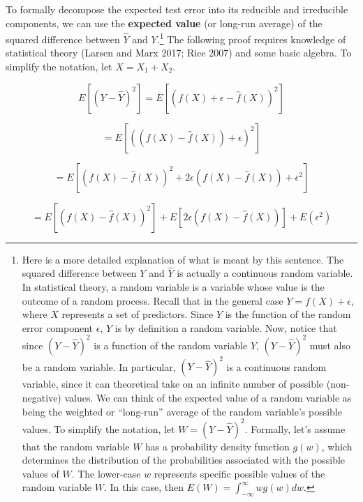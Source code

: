 \documentclass{book}
\begin{document}
To formally decompose the expected test error into its reducible and
irreducible components, we can use the \textbf{expected value} (or long-run
average) of the squared difference between \(\hat{Y}\) and \(Y\).\footnote{Here
  is a more detailed explanation of what is meant by this sentence. The
  squared difference between \(Y\) and \(\hat{Y}\) is actually a continuous
  random variable. In statistical theory, a random variable is a variable
  whose value is the outcome of a random process. Recall that in the general
  case \(Y = f(X) + \epsilon\), where \(X\) represents a set of predictors.
  Since \(Y\) is the function of the random error component \(\epsilon\),
  \(Y\) is by definition a random variable. Now, notice that since
  \((Y-\hat{Y})^{2}\) is a function of the random variable \(Y\),
  \((Y-\hat{Y})^{2}\) must also be a random variable. In particular,
  \((Y-\hat{Y})^{2}\) is a continuous random variable, since it can
  theoretical take on an infinite number of possible (non-negative) values. We
  can think of the expected value of a random variable as being the weighted
  or ``long-run'' average of the random variable's possible values. To
  simplify the notation, let \(W=(Y-\hat{Y})^{2}\). Formally, let's assume
  that the random variable \(W\) has a probability density function \(g(w)\),
  which determines the distribution of the probabilities associated with the
  possible values of \(W\). The lower-case \(w\) represents specific possible
  values of the random variable \(W\). In this case, then
  \(E(W) = \int_{-\infty}^{\infty} wg(w) dw\).} The following proof requires
knowledge of statistical theory (Larsen and Marx 2017; Rice 2007) and some
basic algebra. To simplify the notation, let \(X=X_{1}+X_{2}\).

\[E \left[  \left( Y-\hat{Y} \right) ^{2} \right] =E \left[  \left( f \left( X \right) + \epsilon -\hat{f} \left( X \right)  \right) ^{2} \right]\]

\[=E \left[  \left(  \left( f \left( X \right) -\hat{f} \left( X \right)  \right) + \epsilon  \right) ^{2} \right]\]

\[=E \left[  \left( f \left( X \right) -\hat{f} \left( X \right)  \right) ^{2}+2 \epsilon  \left( f \left( X \right) -\hat{f} \left( X \right)  \right) + \epsilon ^{2} \right]\]

\[=E \left[  \left( f \left( X \right) -\hat{f} \left( X \right)  \right) ^{2} \right] +E \left[ 2 \epsilon  \left( f \left( X \right) -\hat{f} \left( X \right)  \right)  \right] +E \left(  \epsilon ^{2} \right)\]
\end{document}

